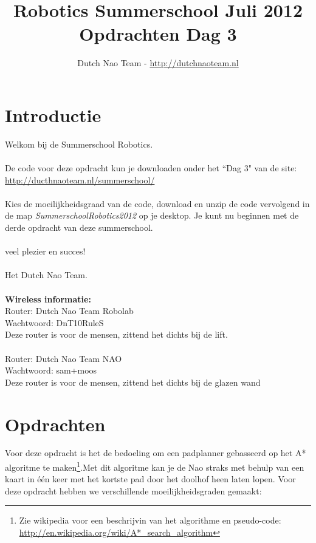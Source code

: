\documentclass[a4paper]{article}
\title{\textbf{Robotics Summerschool Juli 2012} \\ Opdrachten Dag 3}
\author{Dutch Nao Team - \url{http://dutchnaoteam.nl}}
\date{}
\begin{document}
\maketitle

\section{Introductie}
Welkom bij de Summerschool Robotics.\\
\\
De code voor deze opdracht kun je downloaden onder het ``Dag 3" van de site:\\ 
\url{http://ducthnaoteam.nl/summerschool/}\\
\\
Kies de moeilijkheidsgraad van de code, download en unzip de code vervolgend in de map \textit{SummerschoolRobotics2012} op je desktop. Je kunt nu beginnen met de derde opdracht van deze summerschool. \\
\\
veel plezier en succes!\\
\\
Het Dutch Nao Team.\\
\\
\textbf{Wireless informatie:}\\
Router:  Dutch Nao Team Robolab\\
Wachtwoord: DnT10RuleS\\
Deze router is voor de mensen, zittend het dichts bij de lift.\\
\\
Router:  Dutch Nao Team NAO\\
Wachtwoord: sam+moos\\
Deze router is voor de mensen, zittend het dichts bij de glazen wand

\tableofcontents

\newpage

\section{Opdrachten}
Voor deze opdracht is het de bedoeling om een padplanner gebasseerd op het A* algoritme te maken\footnote{Zie wikipedia voor een beschrijvin van het algorithme en pseudo-code: \url{http://en.wikipedia.org/wiki/A*_search_algorithm}}.Met dit algoritme kan je de Nao straks met behulp van een kaart in \'e\'en keer met het kortste pad door het doolhof heen laten lopen. Voor deze opdracht hebben we verschillende moeilijkheidsgraden gemaakt:
\end{document}
